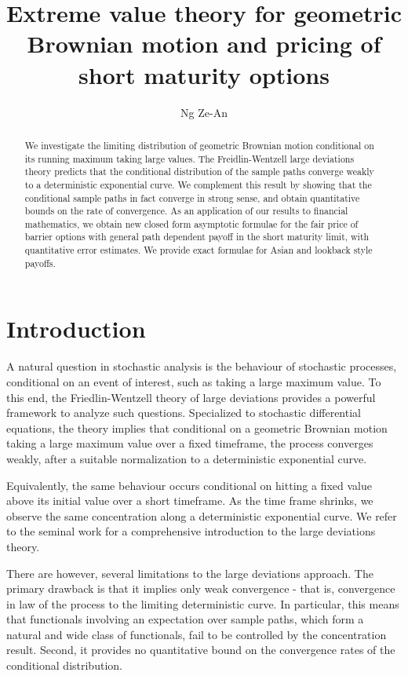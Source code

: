 \documentclass{article}
\title{Extreme value theory for geometric Brownian motion and pricing of short maturity  options}
\author{Ng Ze-An}
\date{}
\theoremstyle{definition}
\theoremstyle{definition}
\begin{document}
\maketitle
\begin{abstract}
We investigate the limiting distribution of geometric Brownian motion conditional on its running maximum taking large values. The Freidlin-Wentzell large deviations theory predicts that the conditional distribution of the sample paths converge weakly to a deterministic exponential curve. We complement this result by showing that the conditional sample paths in fact converge in strong sense, and obtain quantitative bounds on the rate of convergence. As an application of our results to financial mathematics, we obtain new closed form asymptotic formulae for the fair price of barrier options with general path dependent payoff in the short maturity limit, with quantitative error estimates. We provide exact formulae for Asian and lookback style payoffs.
\end{abstract}



\section{Introduction}

A natural question in stochastic analysis is the behaviour of stochastic processes, conditional on an event of interest, such as taking a large maximum value. To this end, the Friedlin-Wentzell theory of large deviations provides a powerful framework to analyze such questions. Specialized to stochastic differential equations, the theory implies that conditional on a geometric Brownian motion taking a large maximum value over a fixed timeframe, the process converges weakly, after a suitable normalization to a deterministic exponential curve. 

Equivalently, the same behaviour occurs conditional on hitting a fixed value above its initial value over a short timeframe. As the time frame shrinks, we observe the same concentration along a deterministic exponential curve. We refer to the seminal work \cite{Arnold1984RandomPO} for a comprehensive introduction to the large deviations theory.

There are however, several limitations to the large deviations approach. The primary drawback is that it implies only weak convergence - that is, convergence in law of the process to the limiting deterministic curve. In particular, this means that functionals involving an expectation over sample paths, which form a natural and wide class of functionals, fail to be controlled by the concentration result. Second, it provides no quantitative bound on the convergence rates of the conditional distribution. 
\end{document}
